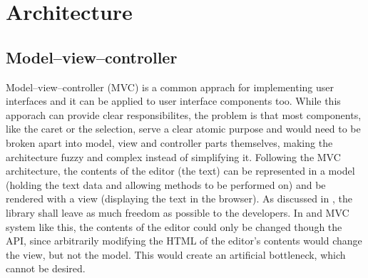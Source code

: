 \section{Architecture}



\subsection{Model--view--controller}

Model--view--controller (MVC) is a common apprach for implementing user interfaces and it can be applied to user interface components too. While this apporach can provide clear responsibilites, the problem is that most components, like the caret or the selection, serve a clear atomic purpose and would need to be broken apart into model, view and controller parts themselves, making the architecture fuzzy and complex instead of simplifying it. Following the MVC architecture, the contents of the editor (the text) can be represented in a model (holding the text data and allowing methods to be performed on) and be rendered with a view (displaying the text in the browser). As discussed in , the library shall leave as much freedom as possible to the developers. In and MVC system like this, the contents of the editor could only be changed though the API, since arbitrarily modifying the HTML of the editor's contents would change the view, but not the model. This would create an artificial bottleneck, which cannot be desired.




